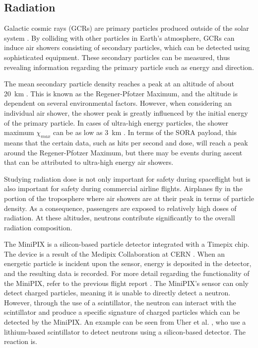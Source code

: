 \subsection{Radiation}
\label{sec: Radiation Background}

Galactic cosmic rays (GCRs) are primary particles produced outside of the solar system \cite{GCRs}.
By colliding with other particles in Earth's atmosphere, GCRs can induce air showers consisting of secondary particles, which can be detected using sophisticated equipment.
These secondary particles can be measured, thus revealing information regarding the primary particle such as energy and direction. 

The mean secondary particle density reaches a peak at an altitude of about \SI{20}{\kilo\meter} \cite{regener}.
This is known as the Regener-Pfotzer Maximum, and the altitude is dependent on several environmental factors.
However, when considering an individual air shower, the shower peak is greatly influenced by the initial energy of the primary particle.
In cases of ultra-high energy particles, the shower maximum $\chi _{max}$ can be as low as \SI{3}{\kilo\meter} \cite{Frank}.
In terms of the SORA payload, this means that the certain data, such as hits per second and dose, will reach a peak around the Regener-Pfotzer Maximum, but there may be events during ascent that can be attributed to ultra-high energy air showers.

Studying radiation dose is not only important for safety during spaceflight but is also important for safety during commercial airline flights.
Airplanes fly in the portion of the troposphere where air showers are at their peak in terms of particle density. As a consequence, passengers are exposed to relatively high doses of radiation.
At these altitudes, neutrons contribute significantly to the overall radiation composition.

The MiniPIX \cite{silicon_sensor} is a silicon-based particle detector integrated with a Timepix \cite{timepix} chip. The device is a result of the Medipix Collaboration at CERN \cite{medipix}. 
When an energetic particle is incident upon the sensor, energy is deposited in the detector, and the resulting data is recorded.
For more detail regarding the functionality of the MiniPIX, refer to the previous flight report \cite{SORA}.
The MiniPIX's sensor can only detect charged particles, meaning it is unable to directly detect a neutron. However, through the use of a scintillator, the neutron can interact with the scintillator and produce a specific signature of charged particles which can be detected by the MiniPIX.
An example can be seen from Uher et al. \cite{Uher}, who use a lithium-based scintillator to detect neutrons using a silicon-based detector. The reaction is.

